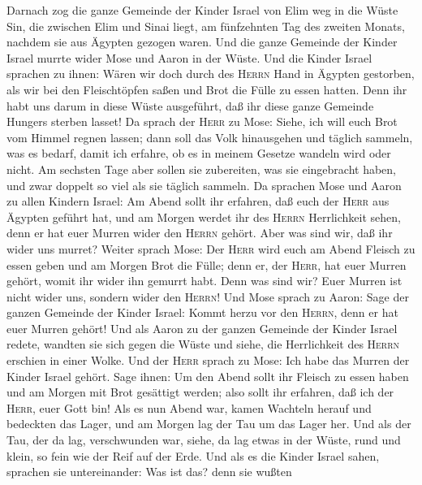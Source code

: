  Darnach zog die ganze Gemeinde der Kinder Israel von Elim
weg in die Wüste Sin, die zwischen Elim und Sinai liegt, am fünfzehnten
Tag des zweiten Monats, nachdem sie aus Ägypten gezogen waren.
 Und die ganze Gemeinde der Kinder Israel murrte wider
Mose und Aaron in der Wüste.  Und die Kinder Israel
sprachen zu ihnen: Wären wir doch durch des \textsc{Herrn} Hand in
Ägypten gestorben, als wir bei den Fleischtöpfen saßen und Brot die
Fülle zu essen hatten. Denn ihr habt uns darum in diese Wüste
ausgeführt, daß ihr diese ganze Gemeinde Hungers sterben lasset!
 Da sprach der \textsc{Herr} zu Mose: Siehe, ich will euch
Brot vom Himmel regnen lassen; dann soll das Volk hinausgehen und
täglich sammeln, was es bedarf, damit ich erfahre, ob es in meinem
Gesetze wandeln wird oder nicht.  Am sechsten Tage aber
sollen sie zubereiten, was sie eingebracht haben, und zwar doppelt so
viel als sie täglich sammeln.  Da sprachen Mose und Aaron
zu allen Kindern Israel: Am Abend sollt ihr erfahren, daß euch der
\textsc{Herr} aus Ägypten geführt hat,  und am Morgen
werdet ihr des \textsc{Herrn} Herrlichkeit sehen, denn er hat euer
Murren wider den \textsc{Herrn} gehört. Aber was sind wir, daß ihr wider
uns murret?  Weiter sprach Mose: Der \textsc{Herr} wird
euch am Abend Fleisch zu essen geben und am Morgen Brot die Fülle; denn
er, der \textsc{Herr}, hat euer Murren gehört, womit ihr wider ihn
gemurrt habt. Denn was sind wir? Euer Murren ist nicht wider uns,
sondern wider den \textsc{Herrn}!  Und Mose sprach zu
Aaron: Sage der ganzen Gemeinde der Kinder Israel: Kommt herzu vor den
\textsc{Herrn}, denn er hat euer Murren gehört!  Und als
Aaron zu der ganzen Gemeinde der Kinder Israel redete, wandten sie sich
gegen die Wüste und siehe, die Herrlichkeit des \textsc{Herrn} erschien
in einer Wolke.  Und der \textsc{Herr} sprach zu Mose:
 Ich habe das Murren der Kinder Israel gehört. Sage
ihnen: Um den Abend sollt ihr Fleisch zu essen haben und am Morgen mit
Brot gesättigt werden; also sollt ihr erfahren, daß ich der
\textsc{Herr}, euer Gott bin!  Als es nun Abend war,
kamen Wachteln herauf und bedeckten das Lager, und am Morgen lag der Tau
um das Lager her.  Und als der Tau, der da lag,
verschwunden war, siehe, da lag etwas in der Wüste, rund und klein, so
fein wie der Reif auf der Erde.  Und als es die Kinder
Israel sahen, sprachen sie untereinander: Was ist das? denn sie wußten
